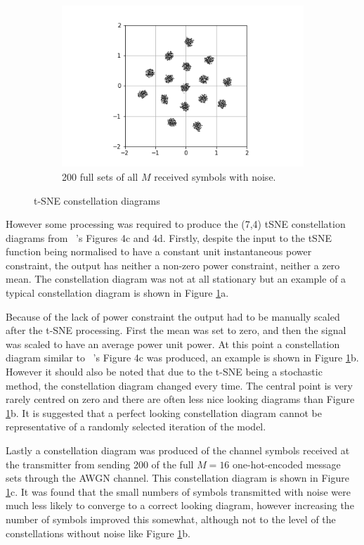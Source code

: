 \documentclass[12pt,onecolumn,letterpaper]{article}
\begin{document}
\begin{figure}[t!]
\begin{subfigure}[t]{0.3\textwidth}
       \includegraphics[width=\linewidth]{figures/tSNE_7_4_constellation_diagram_with_noise_200.png}
       \caption{200 full sets of all $M$ received symbols with noise.}
   \end{subfigure}
   \caption{t-SNE constellation diagrams}
   \label{fig:tSneConstellationDiags}
\end{figure}

However some processing was required to produce the (7,4) tSNE constellation diagrams from ~\cite{oShea}'s Figures 4c and 4d. Firstly, despite the input to the tSNE function being normalised to have a constant unit instantaneous power constraint, the output has neither a non-zero power constraint, neither a zero mean. The constellation diagram was not at all stationary but an example of a typical constellation diagram is shown in Figure \ref{fig:tSneConstellationDiags}a.

Because of the lack of power constraint the output had to be manually scaled after the t-SNE processing. First the mean was set to zero, and then the signal was scaled to have an average power unit power. At this point a constellation diagram similar to ~\cite{oShea}'s Figure 4c was produced, an example is shown in Figure \ref{fig:tSneConstellationDiags}b. However it should also be noted that due to the t-SNE being a stochastic method, the constellation diagram changed every time. The central point is very rarely centred on zero and there are often less nice looking diagrams than Figure \ref{fig:tSneConstellationDiags}b. It is suggested that a perfect looking constellation diagram cannot be representative of a randomly selected iteration of the model.

Lastly a constellation diagram was produced of the channel symbols received at the transmitter from sending 200 of the full $M=16$ one-hot-encoded message sets through the AWGN channel. This constellation diagram is shown in Figure \ref{fig:tSneConstellationDiags}c. It was found that the small numbers of symbols transmitted with noise were much less likely to converge to a correct looking diagram, however increasing the number of symbols improved this somewhat, although not to the level of the constellations without noise like Figure \ref{fig:tSneConstellationDiags}b.
\end{document}
